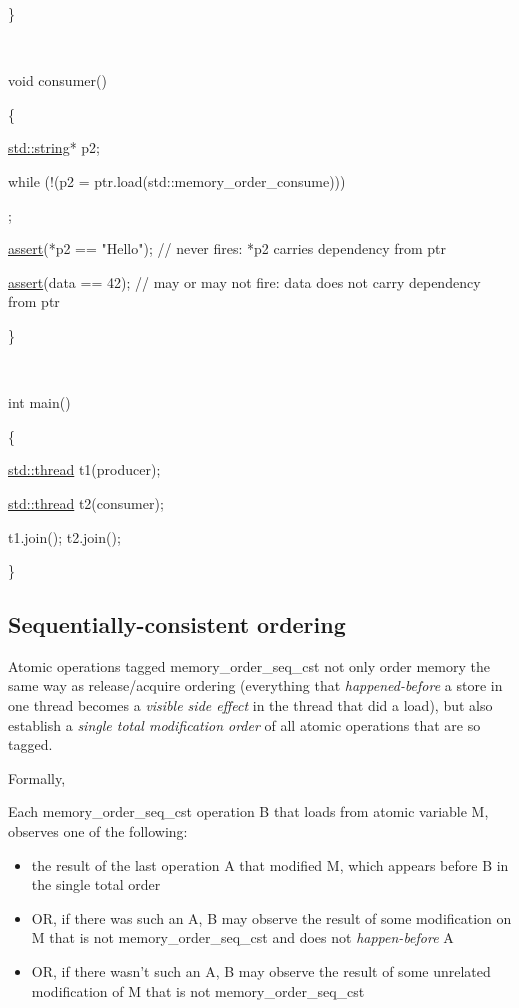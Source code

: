 \documentclass[
]{article}
\begin{document}
\}

~

void consumer()

\{

\href{http://en.cppreference.com/w/cpp/string/basic_string}{std::string}*
p2;

while (!(p2 = ptr.load(std::memory\_order\_consume)))

;

\href{http://en.cppreference.com/w/cpp/error/assert}{assert}(*p2 ==
"Hello"); // never fires: *p2 carries dependency from ptr

\href{http://en.cppreference.com/w/cpp/error/assert}{assert}(data ==
42); // may or may not fire: data does not carry dependency from ptr

\}

~

int main()

\{

\href{http://en.cppreference.com/w/cpp/thread/thread}{std::thread}
t1(producer);

\href{http://en.cppreference.com/w/cpp/thread/thread}{std::thread}
t2(consumer);

t1.join(); t2.join();

\}

\hypertarget{sequentially-consistent-ordering}{%
\subsection{Sequentially-consistent
ordering}\label{sequentially-consistent-ordering}}

Atomic operations tagged memory\_order\_seq\_cst not only order memory
the same way as release/acquire ordering (everything that
\emph{happened-before} a store in one thread becomes a \emph{visible
side effect} in the thread that did a load), but also establish a
\emph{single total modification order} of all atomic operations that are
so tagged.

Formally,

Each memory\_order\_seq\_cst operation B that loads from atomic variable
M, observes one of the following:

\begin{itemize}
\item
  the result of the last operation A that modified M, which appears
  before B in the single total order
\item
  OR, if there was such an A, B may observe the result of some
  modification on M that is not memory\_order\_seq\_cst and does not
  \emph{happen-before} A
\item
  OR, if there wasn't such an A, B may observe the result of some
  unrelated modification of M that is not memory\_order\_seq\_cst
\end{itemize}
\end{document}
